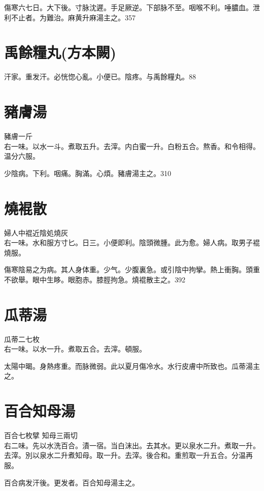 傷寒六七日。大下後。{\khaaitp 寸}脉沈遲。手足厥逆。下部脉不至。咽喉不利。唾膿血。泄利不止者。为難治。麻黄升麻湯主之。357

\section{禹餘糧丸{\scriptsize (方本闕)}}

汗家。重发汗。必恍惚心亂。小便已。陰疼。与禹餘糧丸。88

\section{豬膚湯}

豬膚{\scriptsize 一斤}\\
右一味。以水一斗。煮取五升。去滓。内白蜜一升。白粉五合。熬香。和令相得。温分六服。

少陰病。下利。咽痛。胸滿。心煩。豬膚湯主之。310

\section{燒裩散}

婦人中裩近陰処燒灰\\
右一味。水和服方寸匕。日三。小便即利。陰頭微腫。此为愈。婦人病。取男子裩燒服。

傷寒陰易之为病。其人身体重。少气。少腹裏急。或引陰中拘攣。熱上衝胸。頭重不欲舉。眼中生眵。{\khaaitp 眼胞赤。}膝脛拘急。燒裩散主之。392

\section{瓜蒂湯}

瓜蒂{\scriptsize 二七枚}\\
右一味。以水一升。煮取五合。去滓。頓服。

太陽中暍。身熱疼重。而脉微弱。此以夏月傷冷水。水行皮膚中所致也。瓜蒂湯主之。

\section{百合知母湯}

百合{\scriptsize 七枚擘} 知母{\scriptsize 三兩切}\\
右二味。先以水洗百合。漬一宿。当白沫出。去其水。更以泉水二升。煮取一升。去滓。別以泉水二升煮知母。取一升。去滓。後合和。重煎取一升五合。分温再服。

百合病发汗後。更发者。百合知母湯主之。

